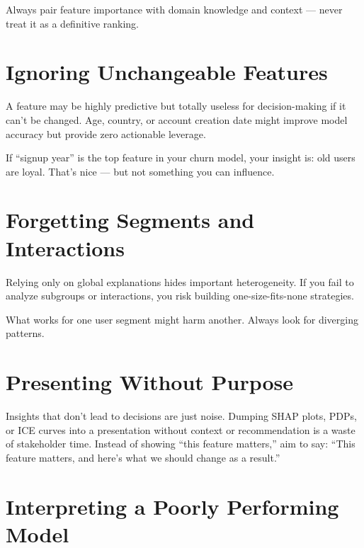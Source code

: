 \documentclass[12pt,openany]{book}
\begin{document}
\begin{notebox}
Always pair feature importance with domain knowledge and context — never treat it as a definitive ranking.
\end{notebox}



\section{Ignoring Unchangeable Features}

A feature may be highly predictive but totally useless for decision-making if it can’t be changed. Age, country, or account creation date might improve model accuracy but provide zero actionable leverage.

\begin{examplebox}
If “signup year” is the top feature in your churn model, your insight is: old users are loyal. That’s nice — but not something you can influence.
\end{examplebox}



\section{Forgetting Segments and Interactions}

Relying only on global explanations hides important heterogeneity. If you fail to analyze subgroups or interactions, you risk building one-size-fits-none strategies.

\begin{notebox}
What works for one user segment might harm another. Always look for diverging patterns.
\end{notebox}



\section{Presenting Without Purpose}

Insights that don’t lead to decisions are just noise. Dumping SHAP plots, PDPs, or ICE curves into a presentation without context or recommendation is a waste of stakeholder time. Instead of showing “this feature matters,” aim to say: “This feature matters, and here’s what we should change as a result.”



\section{Interpreting a Poorly Performing Model}
\end{document}
